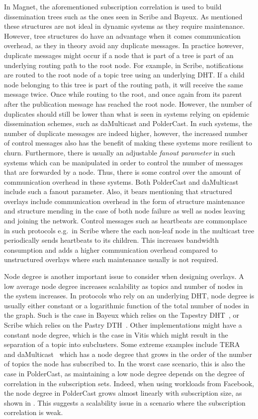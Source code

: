 In Magnet, the aforementioned subscription correlation is used to build
dissemination trees such as the ones seen in Scribe and Bayeux. As
mentioned these structures are not ideal in dynamic systems as they
require maintenance. However, tree structures do have an advantage when
it comes communication overhead, as they in theory avoid any duplicate
messages. In practice however, duplicate messages might occur if a node
that is part of a tree is part of an underlying routing path to the root
node. For example, in Scribe, notifications are routed to the root node
of a topic tree using an underlying DHT. If a child node belonging to
this tree is part of the routing path, it will receive the same message
twice. Once while routing to the root, and once again from its parent
after the publication message has reached the root node. However, the
number of duplicates should still be lower than what is seen in systems
relying on epidemic dissemination schemes, such as daMulticast and
PolderCast. In such systems, the number of duplicate messages are indeed
higher, however, the increased number of control messages also has the
benefit of making these systems more resilient to churn. Furthermore,
there is usually an adjustable \emph{fanout parameter} in such systems
which can be manipulated in order to control the number of messages that
are forwarded by a node. Thus, there is some control over the amount of
communication overhead in these systems. Both PolderCast and daMulticast
include such a fanout parameter. Also, it bears mentioning that
structured overlays include communication overhead in the form of
structure maintenance and structure mending in the case of both node
failure as well as nodes leaving and joining the network. Control
messages such as heartbeats are commonplace in such protocols e.g.\ in
Scribe where the each non-leaf node in the multicast tree periodically
sends heartbeats to its children. This increases bandwidth consumption
and adds a higher communication overhead compared to unstructured
overlays where such maintenance usually is not required.

Node degree is another important issue to consider when designing
overlays. A low average node degree increases scalability as topics and
number of nodes in the system increases. In protocols who rely on an
underlying DHT, node degree is usually either constant or a logarithmic
function of the total number of nodes in the graph. Such is the case in
Bayeux which relies on the Tapestry DHT~\cite{tapestry}, or Scribe which
relies on the Pastry DTH~\cite{Rowstron:2001}. Other implementations
might have a constant node degree, which is the case in Vitis which
might result in the separation of a topic into subclusters. Some extreme
examples include TERA~\cite{Baldoni:2007} and
daMulticast~\cite{voulgaris:2007} which
has a node degree that grows in the order of the number of topics the
node has subscribed to.  In the worst case scenario, this is also the
case in PolderCast, as maintaining a low node degree depends on the
degree of correlation in the subscription sets.  Indeed, when using
workloads from Facebook, the node degree in PolderCast grows almost
linearly with subscription size, as shown in \cite{Setty:2012}. This
suggests a scalability issue in a scenario where the subscription
correlation is weak.

